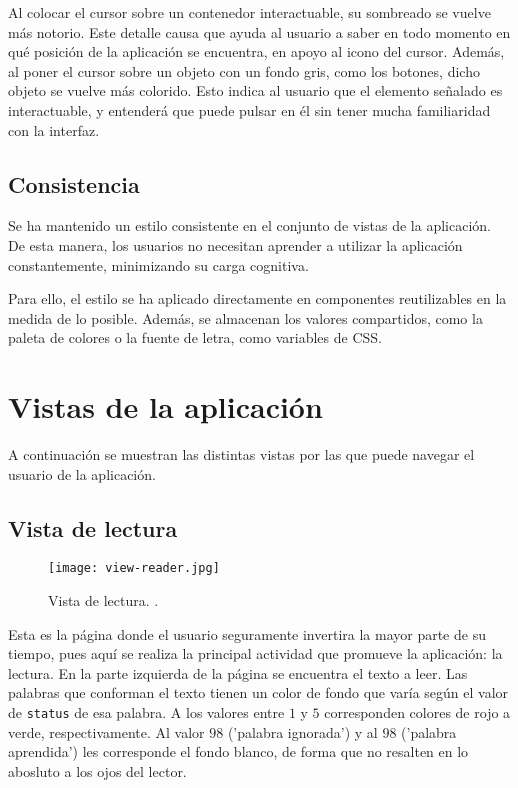 Al colocar el cursor sobre un contenedor interactuable, su sombreado se vuelve más notorio. Este detalle causa que ayuda al usuario a saber en todo momento en qué posición de la aplicación se encuentra, en apoyo al icono del cursor. Además, al poner el cursor sobre un objeto con un fondo gris, como los botones, dicho objeto se vuelve más colorido. Esto indica al usuario que el elemento señalado es interactuable, y entenderá que puede pulsar en él sin tener mucha familiaridad con la interfaz.

\subsection{Consistencia}

Se ha mantenido un estilo consistente en el conjunto de vistas de la aplicación. De esta manera, los usuarios no necesitan aprender a utilizar la aplicación constantemente, minimizando su carga cognitiva.

Para ello, el estilo se ha aplicado directamente en componentes reutilizables en la medida de lo posible. Además, se almacenan los valores compartidos, como la paleta de colores o la fuente de letra, como variables de CSS.

\section{Vistas de la aplicación}

A continuación se muestran las distintas vistas por las que puede navegar el usuario de la aplicación.

\subsection{Vista de lectura}

\begin{figure}[H]
	\texttt{[image: view-reader.jpg]}
	\caption[Vista de lectura]{Vista de lectura. .}
\end{figure}

Esta es la página donde el usuario seguramente invertira la mayor parte de su tiempo, pues aquí se realiza la principal actividad que promueve la aplicación: la lectura. En la parte izquierda de la página se encuentra el texto a leer. Las palabras que conforman el texto tienen un color de fondo que varía según el valor de \texttt{status} de esa palabra. A los valores entre $1$ y $5$ corresponden colores de rojo a verde, respectivamente. Al valor $98$ ('palabra ignorada') y al $98$ ('palabra aprendida') les corresponde el fondo blanco, de forma que no resalten en lo abosluto a los ojos del lector.

